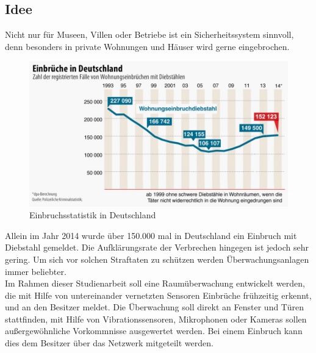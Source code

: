 \subsection{Idee}\label{ss:Idee}

Nicht nur für Museen, Villen oder Betriebe ist ein Sicherheitssystem sinnvoll, denn besonders in private Wohnungen und Häuser wird gerne eingebrochen.

\begin{figure}[H] 
	\centering
	\includegraphics[scale=0.35]{Bilder/einbrueche}
	\caption{Einbruchsstatistik in Deutschland\cite{i:einbrueche}}
	\label{f:einrbrueche}
\end{figure}

Allein im Jahr 2014 wurde über 150.000 mal in Deutschland ein Einbruch mit Diebstahl gemeldet. Die Aufklärungsrate der Verbrechen hingegen ist jedoch sehr gering. Um sich vor solchen Straftaten zu schützen werden Überwachungsanlagen immer beliebter.\\
Im Rahmen dieser Studienarbeit soll eine Raumüberwachung entwickelt werden, die mit Hilfe von untereinander vernetzten Sensoren Einbrüche frühzeitig erkennt, und an den Besitzer meldet. Die Überwachung soll direkt an Fenster und Türen stattfinden, mit Hilfe von Vibrationssensoren, Mikrophonen oder Kameras sollen außergewöhnliche Vorkommnisse ausgewertet werden. Bei einem Einbruch kann dies dem Besitzer über das Netzwerk mitgeteilt werden.

